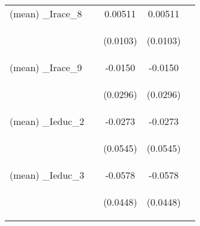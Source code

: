 \documentclass[]{article}
\begin{document}
\begin{center}
\begin{tabular}{lcccc}
(mean) \_Irace\_8 &  & 0.00511 & 0.00511 &  \\
\vspace{4pt} & \begin{footnotesize}\end{footnotesize} & \begin{footnotesize}(0.0103)\end{footnotesize} & \begin{footnotesize}(0.0103)\end{footnotesize} & \begin{footnotesize}\end{footnotesize} \\
(mean) \_Irace\_9 &  & -0.0150 & -0.0150 &  \\
\vspace{4pt} & \begin{footnotesize}\end{footnotesize} & \begin{footnotesize}(0.0296)\end{footnotesize} & \begin{footnotesize}(0.0296)\end{footnotesize} & \begin{footnotesize}\end{footnotesize} \\
(mean) \_Ieduc\_2 &  & -0.0273 & -0.0273 &  \\
\vspace{4pt} & \begin{footnotesize}\end{footnotesize} & \begin{footnotesize}(0.0545)\end{footnotesize} & \begin{footnotesize}(0.0545)\end{footnotesize} & \begin{footnotesize}\end{footnotesize} \\
(mean) \_Ieduc\_3 &  & -0.0578 & -0.0578 &  \\
\vspace{4pt} & \begin{footnotesize}\end{footnotesize} & \begin{footnotesize}(0.0448)\end{footnotesize} & \begin{footnotesize}(0.0448)\end{footnotesize} & \begin{footnotesize}\end{footnotesize} \\

\end{tabular}
\end{center}
\end{document}
